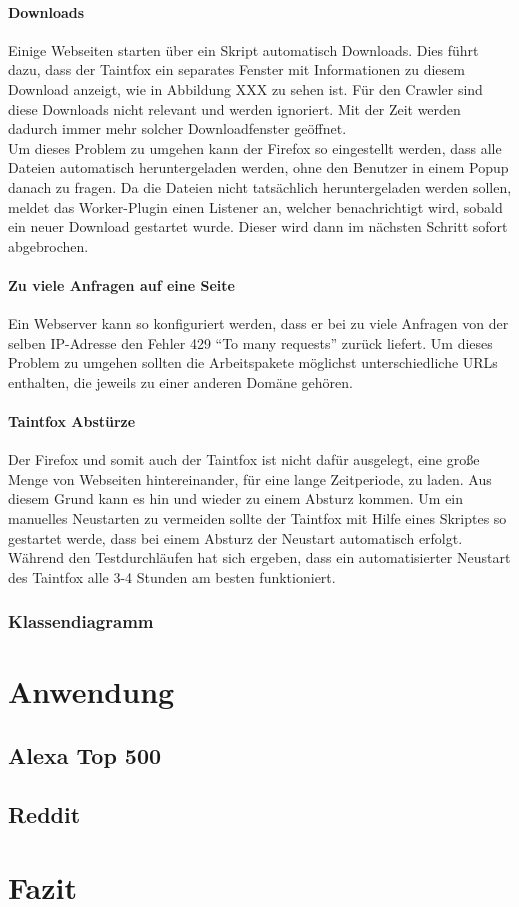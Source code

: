 \subsubsection{Downloads}
Einige Webseiten starten über ein Skript automatisch Downloads. Dies führt dazu, dass der Taintfox ein separates Fenster mit Informationen zu diesem Download anzeigt, wie in Abbildung XXX zu sehen ist. Für den Crawler sind diese Downloads nicht relevant und werden ignoriert. Mit der Zeit werden dadurch immer mehr solcher Downloadfenster geöffnet. \\
Um dieses Problem zu umgehen kann der Firefox so eingestellt werden, dass alle Dateien automatisch heruntergeladen werden, ohne den Benutzer in einem Popup danach zu fragen. Da die Dateien nicht tatsächlich heruntergeladen werden sollen, meldet das Worker-Plugin einen Listener an, welcher benachrichtigt wird, sobald ein neuer Download gestartet wurde. Dieser wird dann im nächsten Schritt sofort abgebrochen.
\subsubsection{Zu viele Anfragen auf eine Seite}
Ein Webserver kann so konfiguriert werden, dass er bei zu viele Anfragen von der selben IP-Adresse den Fehler 429 \enquote{To many requests} zurück liefert. Um dieses Problem zu umgehen sollten die Arbeitspakete möglichst unterschiedliche URLs enthalten, die jeweils zu einer anderen Domäne gehören.
\subsubsection{Taintfox Abstürze}
Der Firefox und somit auch der Taintfox ist nicht dafür ausgelegt, eine große Menge von Webseiten hintereinander, für eine lange Zeitperiode, zu laden. Aus diesem Grund kann es hin und wieder zu einem Absturz kommen. Um ein manuelles Neustarten zu vermeiden sollte der Taintfox mit Hilfe eines Skriptes so gestartet werde, dass bei einem Absturz der Neustart automatisch erfolgt. Während den Testdurchläufen hat sich ergeben, dass ein automatisierter Neustart des Taintfox alle 3-4 Stunden am besten funktioniert.
\subsection{Klassendiagramm}
\chapter{Anwendung}
\section{Alexa Top 500}
\section{Reddit}

\chapter{Fazit}

